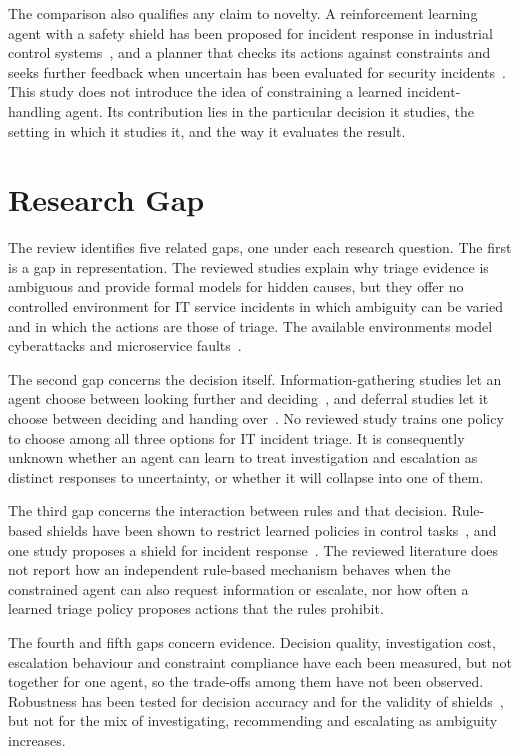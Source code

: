 \documentclass[12pt,a4paper]{article}
\begin{document}
The comparison also qualifies any claim to novelty. A reinforcement learning agent with a safety shield has been proposed for incident response in industrial control systems~\cite{alauthman2026}, and a planner that checks its actions against constraints and seeks further feedback when uncertain has been evaluated for security incidents~\cite{hammar2026llm}. This study does not introduce the idea of constraining a learned incident-handling agent. Its contribution lies in the particular decision it studies, the setting in which it studies it, and the way it evaluates the result.

\section{Research Gap}

The review identifies five related gaps, one under each research question. The first is a gap in representation. The reviewed studies explain why triage evidence is ambiguous and provide formal models for hidden causes, but they offer no controlled environment for IT service incidents in which ambiguity can be varied and in which the actions are those of triage. The available environments model cyberattacks and microservice faults~\cite{hammar2025,dunsin2025,wang2023hrlhf}.

The second gap concerns the decision itself. Information-gathering studies let an agent choose between looking further and deciding~\cite{janisch2019,kim2025}, and deferral studies let it choose between deciding and handing over~\cite{madras2018,joshi2023,zhang2026falcon}. No reviewed study trains one policy to choose among all three options for IT incident triage. It is consequently unknown whether an agent can learn to treat investigation and escalation as distinct responses to uncertainty, or whether it will collapse into one of them.

The third gap concerns the interaction between rules and that decision. Rule-based shields have been shown to restrict learned policies in control tasks~\cite{alshiekh2018,konighofer2025}, and one study proposes a shield for incident response~\cite{alauthman2026}. The reviewed literature does not report how an independent rule-based mechanism behaves when the constrained agent can also request information or escalate, nor how often a learned triage policy proposes actions that the rules prohibit.

The fourth and fifth gaps concern evidence. Decision quality, investigation cost, escalation behaviour and constraint compliance have each been measured, but not together for one agent, so the trade-offs among them have not been observed. Robustness has been tested for decision accuracy and for the validity of shields~\cite{kim2025,hammar2025,hamel2026}, but not for the mix of investigating, recommending and escalating as ambiguity increases.
\end{document}
